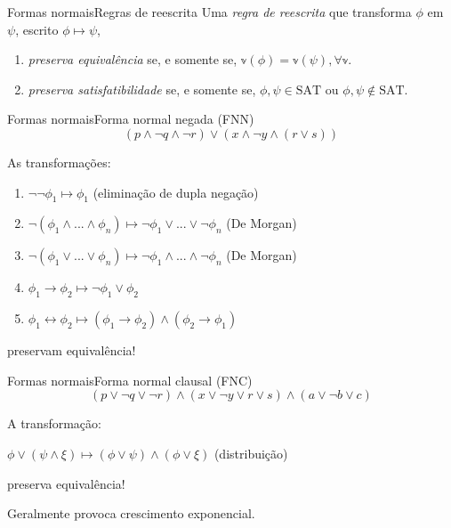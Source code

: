 \begin{frame}{Formas normais}{Regras de reescrita}
	Uma \emph{regra de reescrita} que transforma $\phi$ em $\psi$, escrito $\phi \longmapsto \psi$,
	\begin{enumerate}
		\pause\item \emph{preserva equivalência} se, e somente se, $\mathbb{v}(\phi) = \mathbb{v}(\psi), \forall \mathbb{v}$.
		\pause\item \emph{preserva satisfatibilidade} se, e somente se, $\phi,\psi \in \text{SAT}$ ou $\phi,\psi \notin \text{SAT}$.
	\end{enumerate}
\end{frame}

\begin{frame}{Formas normais}{Forma normal negada (FNN)}
	$$(p \wedge \neg q \wedge \neg r) \vee (x \wedge \neg y \wedge (r \vee s))$$
	
	\pause As transformações:
	\begin{enumerate}
		\pause\item $\neg \neg \phi_1 \longmapsto \phi_1$ \;\; (eliminação de dupla negação)
		\pause\item $\neg(\phi_1 \wedge ... \wedge \phi_n) \longmapsto \neg \phi_1 \vee ... \vee \neg \phi_n$ \;\; (De Morgan)
		\pause\item $\neg(\phi_1 \vee ... \vee \phi_n) \longmapsto \neg \phi_1 \wedge ... \wedge \neg \phi_n$ \;\; (De Morgan)
		\pause\item $\phi_1 \rightarrow \phi_2 \longmapsto \neg \phi_1 \vee \phi_2$
		\pause\item $\phi_1 \leftrightarrow \phi_2 \longmapsto (\phi_1 \rightarrow \phi_2) \wedge (\phi_2 \rightarrow \phi_1)$
	\end{enumerate}
	\pause preservam equivalência!
\end{frame}

\begin{frame}{Formas normais}{Forma normal clausal (FNC)}
	$$(p \vee \neg q \vee \neg r) \wedge (x \vee \neg y \vee r \vee s) \wedge (a \vee \neg b \vee c)$$
	
	\pause A transformação:
	\begin{center}
		$\phi \vee (\psi \wedge \xi) \longmapsto (\phi \vee \psi) \wedge (\phi \vee \xi)$ \;\; (distribuição)
	\end{center}
	\pause preserva equivalência!
	
	\pause Geralmente provoca crescimento exponencial.
\end{frame}

